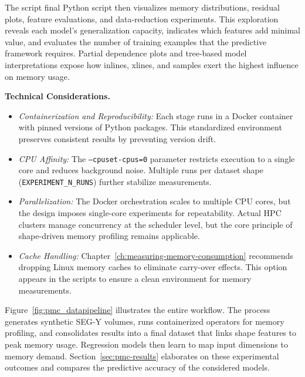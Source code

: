 The script final Python script then visualizes memory distributions, residual plots, feature evaluations, and data-reduction experiments.
This exploration reveals each model’s generalization capacity, indicates which features add minimal value, and evaluates the number of training examples that the predictive framework requires.
Partial dependence plots and tree-based model interpretations expose how inlines, xlines, and samples exert the highest influence on memory usage.

\vspace{1em}
\noindent
\textbf{Technical Considerations.}
\begin{itemize}
    \item \emph{Containerization and Reproducibility:}
    Each stage runs in a Docker container with pinned versions of Python packages.
    This standardized environment preserves consistent results by preventing version drift.
    \item \emph{\ac{CPU} Affinity:}
    The \texttt{--cpuset-cpus=0} parameter restricts execution to a single core and reduces background noise.
    Multiple runs per dataset shape (\texttt{EXPERIMENT\_N\_RUNS}) further stabilize measurements.
    \item \emph{Parallelization:}
    The Docker orchestration scales to multiple \ac{CPU} cores, but the design imposes single-core experiments for repeatability.
    Actual \ac{HPC} clusters manage concurrency at the scheduler level, but the core principle of shape-driven memory profiling remains applicable.
    \item \emph{Cache Handling:}
    Chapter~\ref{ch:measuring-memory-consumption} recommends dropping Linux memory caches to eliminate carry-over effects.
    This option appears in the scripts to ensure a clean environment for memory measurements.
\end{itemize}

\vspace{1em}
\noindent
Figure~\ref{fig:pmc_datapipeline} illustrates the entire workflow.
The process generates synthetic \ac{SEG-Y} volumes, runs containerized operators for memory profiling, and consolidates results into a final dataset that links shape features to peak memory usage.
Regression models then learn to map input dimensions to memory demand.
Section~\ref{sec:pmc-results} elaborates on these experimental outcomes and compares the predictive accuracy of the considered models.


